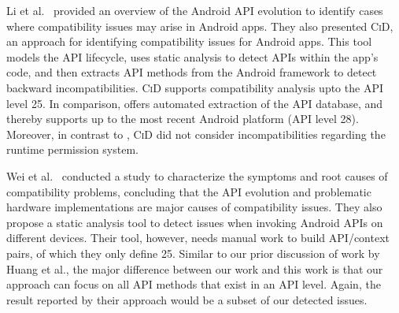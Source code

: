 Li et al.~\cite{lili2018cid} provided an overview of the
Android API evolution to identify cases where compatibility
issues may arise in Android apps. They also presented
\textsc{CiD}, an approach for identifying compatibility
issues for Android apps. This tool models the API lifecycle,
uses static analysis to detect APIs within the app's code,
and then extracts API methods from the Android framework to
detect backward incompatibilities.  \textsc{CiD} supports
compatibility analysis upto the API level 25.  In
comparison, \@approach offers automated extraction of the
API database, and thereby supports up to the most recent
Android platform (API level 28).  Moreover, in contrast to
\@approach, \textsc{CiD} did not consider incompatibilities
regarding the runtime permission system.

Wei et al.~\cite{wei2016taming} conducted a study to
characterize the symptoms and root causes of compatibility
problems, concluding that the API evolution and problematic
hardware implementations are major causes of compatibility
issues. They also propose a static analysis tool to detect
issues when invoking Android APIs on different devices.
Their tool, however, needs manual work to build API/context
pairs, of which they only define 25. Similar to our prior
discussion of work by Huang et al., the major difference
between our work and this work is that our approach can
focus on all API methods that exist in an API level. Again,
the result reported by their approach would be a subset of
our detected issues.

